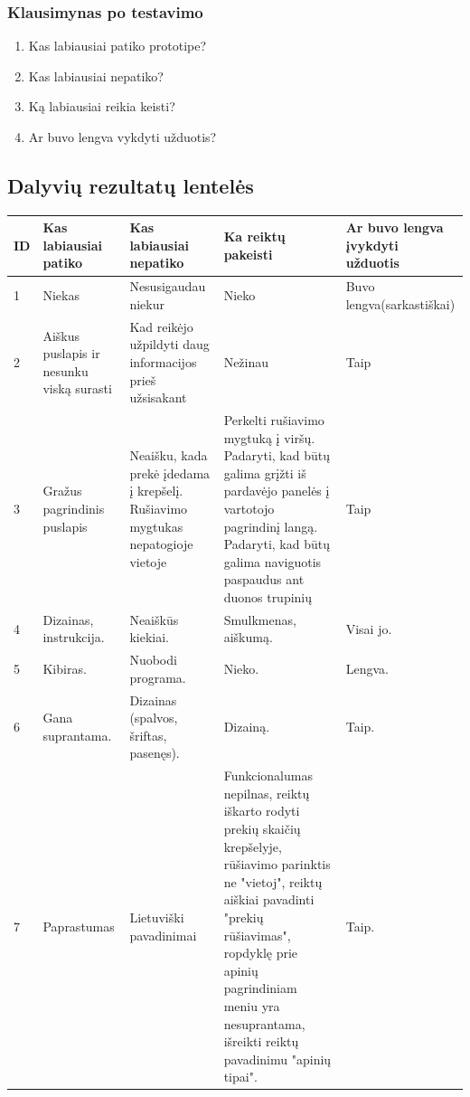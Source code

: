 \documentclass[oneside]{VUMIFPSkursinis}
\begin{document}
	\subsubsection{Klausimynas po testavimo}
	\begin{enumerate}
			\item{Kas labiausiai patiko prototipe?}
			\item{Kas labiausiai nepatiko?}
			\item{Ką labiausiai reikia keisti?}
			\item{Ar buvo lengva vykdyti užduotis?}
	\end{enumerate}
	
	\subsection{Dalyvių rezultatų lentelės}
\begin{center}
    \begin{tabular}{ |p{1cm} | p{3cm} | p{4cm} | p{4cm} | p{3cm} |}
    \hline
	ID&Kas labiausiai patiko&Kas labiausiai nepatiko&Ka reiktų pakeisti&Ar buvo lengva įvykdyti užduotis\\ \hline
	1&Niekas&Nesusigaudau niekur&Nieko&Buvo lengva(sarkastiškai) \\ \hline
	2&Aiškus puslapis ir nesunku viską surasti&Kad reikėjo užpildyti daug informacijos prieš užsisakant&Nežinau&Taip \\ \hline
	3&Gražus pagrindinis puslapis&Neaišku, kada prekė įdedama į krepšelį. Rušiavimo mygtukas nepatogioje vietoje&Perkelti rušiavimo mygtuką į viršų. Padaryti, kad būtų galima grįžti iš pardavėjo panelės į vartotojo pagrindinį langą. Padaryti, kad būtų galima naviguotis paspaudus ant duonos trupinių&Taip \\ \hline
	4&Dizainas, instrukcija.&Neaiškūs kiekiai.&Smulkmenas, aiškumą.&Visai jo. \\ \hline
	5&Kibiras.&Nuobodi programa.&Nieko.&Lengva. \\ \hline
	6&Gana suprantama.&Dizainas (spalvos, šriftas, pasenęs).&Dizainą.&Taip. \\ \hline
	7&Paprastumas&Lietuviški pavadinimai&Funkcionalumas nepilnas, reiktų iškarto rodyti prekių skaičių krepšelyje, rūšiavimo parinktis ne "vietoj", reiktų aiškiai pavadinti "prekių rūšiavimas", ropdyklę prie apinių pagrindiniam meniu yra nesuprantama, išreikti reiktų pavadinimu "apinių tipai".&Taip. \\ \hline
   \hline
    \end{tabular}
\end{center}
\end{document}
